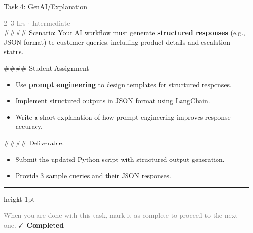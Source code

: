 \documentclass[10pt,a4paper]{article}
\begin{document}
\begin{taskbox}{Task 4: GenAI/Explanation}

    {\small \textcolor{gray}{2--3 hrs $\cdot$ Intermediate}}\\[12pt]

    \#\#\#\# Scenario:
Your AI workflow must generate \textbf{structured responses} (e.g., JSON format) to customer queries, including product details and escalation status.

\#\#\#\# Student Assignment:
\begin{itemize}
    \item Use \textbf{prompt engineering} to design templates for structured responses.
    \item Implement structured outputs in JSON format using LangChain.
    \item Write a short explanation of how prompt engineering improves response accuracy.
\end{itemize}

\#\#\#\# Deliverable:
\begin{itemize}
    \item Submit the updated Python script with structured output generation.
    \item Provide 3 sample queries and their JSON responses.\par
\end{itemize}

    \vspace{16pt}

    \textcolor{cardBorder}{\hrule height 1pt}\vspace{8pt}

    \small \textcolor{gray}{When you are done with this task, mark it as complete to proceed to the next one.} \hfill \textbf{\textcolor{brandDark}{$\checkmark$ Completed}}

\end{taskbox}
\end{document}
